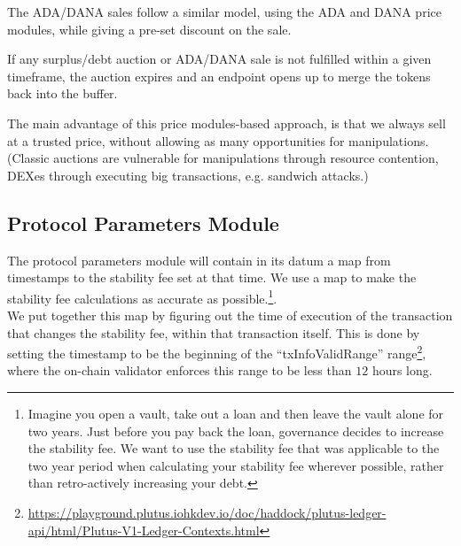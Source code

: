 \documentclass{article} %
\begin{document}
%


% 

The ADA/DANA sales follow a similar model, using the ADA and DANA price modules,
while giving a pre-set discount on the sale.

If any surplus/debt auction or ADA/DANA sale is not fulfilled within a given
timeframe, the auction expires and an endpoint opens up to merge the tokens back
into the buffer.

The main advantage of this price modules-based approach, is that we always sell
at a trusted price, without allowing as many opportunities for manipulations.
(Classic auctions are vulnerable for manipulations through resource contention,
DEXes through executing big transactions, e.g. sandwich attacks.)
 
\subsection{Protocol Parameters Module}

The protocol parameters module will contain in its datum a map from timestamps to the stability fee
set at that time.
We use a map to make the stability fee calculations as accurate as
possible.\footnote{
  Imagine you open a vault, take out a loan and then leave the vault alone for
  two years.
  Just before you pay back the loan, governance decides to increase the
  stability fee.
  We want to use the stability fee that was applicable to the two year period
  when calculating your stability fee wherever possible, rather than
  retro-actively increasing your debt.
}. \\

We put together this map by figuring out the time of execution of the
transaction that changes the stability fee, within that transaction itself.
This is done by setting the timestamp to be the beginning of the
``txInfoValidRange'' range\footnote{
  \url{https://playground.plutus.iohkdev.io/doc/haddock/plutus-ledger-api/html/Plutus-V1-Ledger-Contexts.html}},
where the on-chain validator enforces this range to be less than $12$ hours
long. \\
\end{document}
